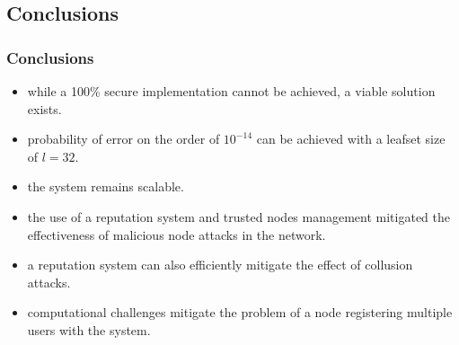\subsection{Conclusions}
\begin{frame}[allowframebreaks]
\frametitle{Conclusions}
\begin{itemize}
    \item while a 100\% secure implementation cannot be achieved, a viable solution exists.
    \item probability of error on the order of $10^{-14}$ can be achieved with a leafset size of $l = 32$.
    \item the system remains scalable.
    \framebreak
    \item the use of a reputation system and trusted nodes management mitigated the effectiveness of malicious node attacks in the network.
    \item a reputation system can also efficiently mitigate the effect of collusion attacks.
    \item computational challenges mitigate the problem of a node registering multiple users with the system.
\end{itemize}
\end{frame}
